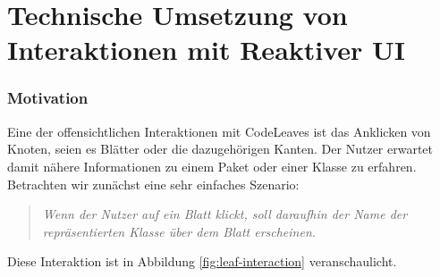 \section{Technische Umsetzung von Interaktionen mit Reaktiver UI}

\subsubsection*{Motivation}
Eine der offensichtlichen Interaktionen mit CodeLeaves ist das Anklicken von Knoten, seien es Blätter oder die dazugehörigen Kanten. Der Nutzer erwartet damit nähere Informationen zu einem Paket oder einer Klasse zu erfahren. Betrachten wir zunächst eine sehr einfaches Szenario:

\begin{quotation}
  \textit{Wenn der Nutzer auf ein Blatt klickt, soll daraufhin der Name der repräsentierten Klasse über dem Blatt erscheinen.}
\end{quotation}

Diese Interaktion ist in Abbildung \ref{fig:leaf-interaction} veranschaulicht.

